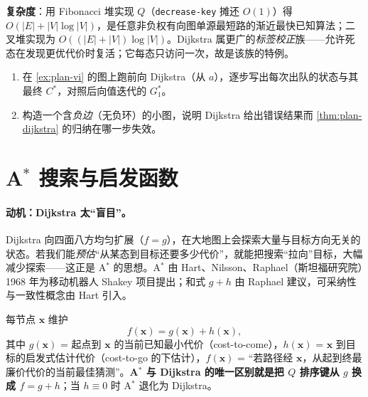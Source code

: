 \noindent\textbf{复杂度}：用 Fibonacci 堆实现 $Q$（\texttt{decrease-key} 摊还 $O(1)$）得 $O(|E|+|V|\log|V|)$，是任意非负权有向图单源最短路的渐近最快已知算法；二叉堆实现为 $O((|E|+|V|)\log|V|)$。Dijkstra 属更广的\emph{标签校正}族——允许死态在发现更优代价时复活；它每态只访问一次，故是该族的特例。

\begin{practice}
\begin{enumerate}
  \item 在 \cref{ex:plan-vi} 的图上跑前向 Dijkstra（从 $a$），逐步写出每次出队的状态与其最终 $C^*$，对照后向值迭代的 $G_1^*$。
  \item 构造一个含\emph{负边}（无负环）的小图，说明 Dijkstra 给出错误结果而 \cref{thm:plan-dijkstra} 的归纳在哪一步失效。
\end{enumerate}
\end{practice}

\section{A$^*$ 搜索与启发函数}
\label{sec:plan-astar}

\paragraph{动机：Dijkstra 太“盲目”。}
Dijkstra 向四面八方均匀扩展（$f=g$），在大地图上会探索大量与目标方向无关的状态。若我们能\emph{预估}“从某态到目标还要多少代价”，就能把搜索“拉向”目标，大幅减少探索——这正是 A$^*$ 的思想。A$^*$ 由 Hart、Nilsson、Raphael（斯坦福研究院）1968 年为移动机器人 Shakey 项目提出\cite{hart1968astar}；和式 $g+h$ 由 Raphael 建议，可采纳性与一致性概念由 Hart 引入。

\begin{definition}[A$^*$ 评价函数]\label{def:plan-astar}
每节点 $\mathbf{x}$ 维护
\begin{equation}
  f(\mathbf{x})=g(\mathbf{x})+h(\mathbf{x}),
  \label{eq:plan-fgh}
\end{equation}
其中 $g(\mathbf{x})$ = 起点到 $\mathbf{x}$ 的当前已知最小代价（cost-to-come），$h(\mathbf{x})$ = $\mathbf{x}$ 到目标的启发式估计代价（cost-to-go 的下估计），$f(\mathbf{x})$ = “若路径经 $\mathbf{x}$，从起到终最廉价代价的当前最佳猜测”。\textbf{A$^*$ 与 Dijkstra 的唯一区别就是把 $Q$ 排序键从 $g$ 换成 $f=g+h$}；当 $h\equiv0$ 时 A$^*$ 退化为 Dijkstra。
\end{definition}

